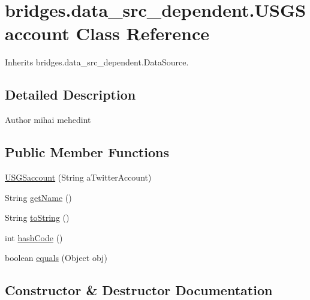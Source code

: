 \hypertarget{classbridges_1_1data__src__dependent_1_1_u_s_g_saccount}{}\section{bridges.\+data\+\_\+src\+\_\+dependent.\+U\+S\+G\+Saccount Class Reference}
\label{classbridges_1_1data__src__dependent_1_1_u_s_g_saccount}


Inherits bridges.\+data\+\_\+src\+\_\+dependent.\+Data\+Source.



\subsection{Detailed Description}
\begin{DoxyAuthor}{Author}
mihai mehedint 
\end{DoxyAuthor}
\subsection*{Public Member Functions}
\begin{DoxyCompactItemize}
\item 
\hyperlink{classbridges_1_1data__src__dependent_1_1_u_s_g_saccount_ae50a964b2b0bd02b905371d6f439b8dd}{U\+S\+G\+Saccount} (String a\+Twitter\+Account)
\item 
String \hyperlink{classbridges_1_1data__src__dependent_1_1_u_s_g_saccount_abc30e69535f158a5f7d6f6d8c8da7bec}{get\+Name} ()
\item 
String \hyperlink{classbridges_1_1data__src__dependent_1_1_u_s_g_saccount_a832c5a4953a40fd3fa89243fcdabc435}{to\+String} ()
\item 
int \hyperlink{classbridges_1_1data__src__dependent_1_1_u_s_g_saccount_afe2cc53d7993aaf4424f42fb535c7ed1}{hash\+Code} ()
\item 
boolean \hyperlink{classbridges_1_1data__src__dependent_1_1_u_s_g_saccount_a408a8361407b49199f56ace3421956bf}{equals} (Object obj)
\end{DoxyCompactItemize}


\subsection{Constructor \& Destructor Documentation}
\mbox{\label{classbridges_1_1data__src__dependent_1_1_u_s_g_saccount_ae50a964b2b0bd02b905371d6f439b8dd}} 
